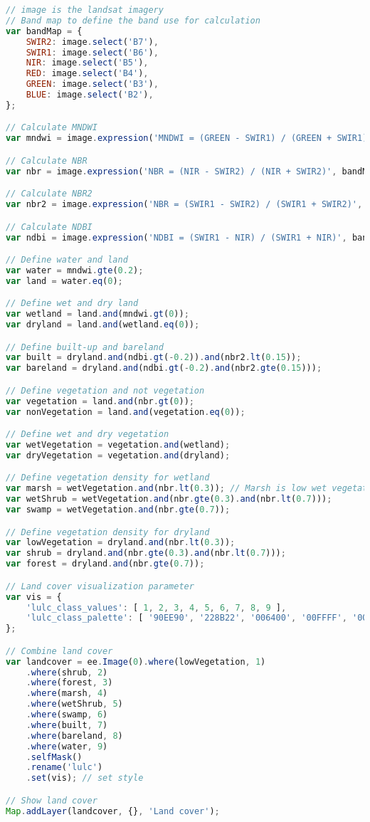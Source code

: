 \begin{lstlisting}[language=JavaScript, label={code:vegetationType}, caption={GEE Script to Classify Vegetation Type using Relational Operation}]
// image is the landsat imagery
// Band map to define the band use for calculation
var bandMap = {
	SWIR2: image.select('B7'),
	SWIR1: image.select('B6'),
	NIR: image.select('B5'),
	RED: image.select('B4'),
	GREEN: image.select('B3'),
	BLUE: image.select('B2'),
};

// Calculate MNDWI
var mndwi = image.expression('MNDWI = (GREEN - SWIR1) / (GREEN + SWIR1)', bandMap);

// Calculate NBR
var nbr = image.expression('NBR = (NIR - SWIR2) / (NIR + SWIR2)', bandMap);

// Calculate NBR2
var nbr2 = image.expression('NBR = (SWIR1 - SWIR2) / (SWIR1 + SWIR2)', bandMap);

// Calculate NDBI
var ndbi = image.expression('NDBI = (SWIR1 - NIR) / (SWIR1 + NIR)', bandMap);

// Define water and land
var water = mndwi.gte(0.2);
var land = water.eq(0);

// Define wet and dry land
var wetland = land.and(mndwi.gt(0));
var dryland = land.and(wetland.eq(0));

// Define built-up and bareland
var built = dryland.and(ndbi.gt(-0.2)).and(nbr2.lt(0.15));
var bareland = dryland.and(ndbi.gt(-0.2).and(nbr2.gte(0.15)));

// Define vegetation and not vegetation
var vegetation = land.and(nbr.gt(0));
var nonVegetation = land.and(vegetation.eq(0));

// Define wet and dry vegetation
var wetVegetation = vegetation.and(wetland);
var dryVegetation = vegetation.and(dryland);

// Define vegetation density for wetland
var marsh = wetVegetation.and(nbr.lt(0.3)); // Marsh is low wet vegetation
var wetShrub = wetVegetation.and(nbr.gte(0.3).and(nbr.lt(0.7)));
var swamp = wetVegetation.and(nbr.gte(0.7));

// Define vegetation density for dryland
var lowVegetation = dryland.and(nbr.lt(0.3));
var shrub = dryland.and(nbr.gte(0.3).and(nbr.lt(0.7)));
var forest = dryland.and(nbr.gte(0.7));	

// Land cover visualization parameter
var vis = {
	'lulc_class_values': [ 1, 2, 3, 4, 5, 6, 7, 8, 9 ], 
	'lulc_class_palette': [ '90EE90', '228B22', '006400', '00FFFF', '00CED1', '008080', 'F08080', 'DEB887', '87CEFA' ]
};

// Combine land cover
var landcover = ee.Image(0).where(lowVegetation, 1)
	.where(shrub, 2)
	.where(forest, 3)
	.where(marsh, 4)
	.where(wetShrub, 5)
	.where(swamp, 6)
	.where(built, 7)
	.where(bareland, 8)
	.where(water, 9)
	.selfMask()
	.rename('lulc')
	.set(vis); // set style

// Show land cover
Map.addLayer(landcover, {}, 'Land cover');

\end{lstlisting}

